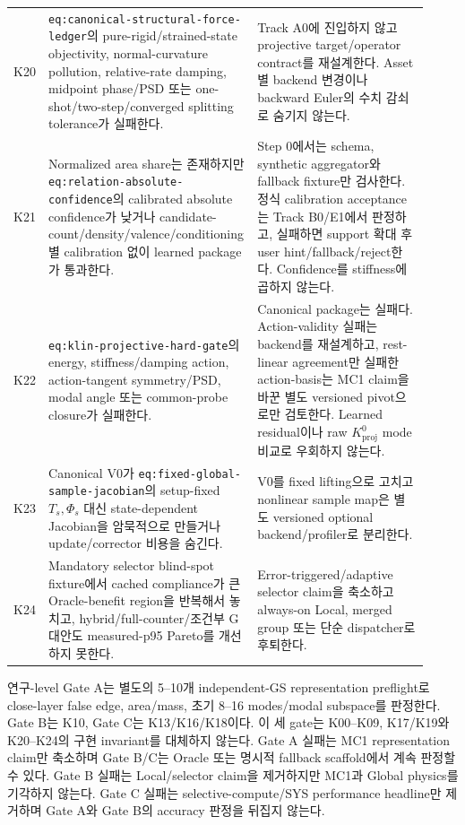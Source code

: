 \documentclass[10pt,a4paper]{article}
\newcommand{\code}[1]{\texttt{#1}}
\begin{document}
\begin{longtable}{L{0.06\linewidth}L{0.45\linewidth}L{0.41\linewidth}}
\addlinespace
K20 & \code{eq:canonical-structural-force-ledger}의 pure-rigid/strained-state objectivity,
normal-curvature pollution, relative-rate damping, midpoint phase/PSD 또는 one-shot/two-step/converged splitting tolerance가 실패한다. & Track A0에 진입하지 않고 projective target/operator contract를 재설계한다. Asset별 backend 변경이나 backward Euler의 수치 감쇠로 숨기지 않는다. \\
\addlinespace
K21 & Normalized area share는 존재하지만 \code{eq:relation-absolute-confidence}의
calibrated absolute confidence가 낮거나 candidate-count/density/valence/conditioning별 calibration 없이 learned package가 통과한다. & Step 0에서는 schema, synthetic aggregator와 fallback fixture만 검사한다. 정식 calibration acceptance는 Track B0/E1에서 판정하고, 실패하면 support 확대 후 user hint/fallback/reject한다. Confidence를 stiffness에 곱하지 않는다. \\
\addlinespace
K22 & \code{eq:klin-projective-hard-gate}의 energy, stiffness/damping action,
action-tangent symmetry/PSD, modal angle 또는 common-probe closure가 실패한다. & Canonical package는 실패다. Action-validity 실패는 backend를 재설계하고, rest-linear agreement만 실패한 action-basis는 MC1 claim을 바꾼 별도 versioned pivot으로만 검토한다. Learned residual이나 raw \(K_{\mathrm{proj}}^0\) mode 비교로 우회하지 않는다. \\
\addlinespace
K23 & Canonical V0가 \code{eq:fixed-global-sample-jacobian}의 setup-fixed
\(T_s,\Phi_s\) 대신 state-dependent Jacobian을 암묵적으로 만들거나 update/corrector 비용을 숨긴다. & V0를 fixed lifting으로 고치고 nonlinear sample map은 별도 versioned optional backend/profiler로 분리한다. \\
\addlinespace
K24 & Mandatory selector blind-spot fixture에서 cached compliance가 큰 Oracle-benefit region을 반복해서 놓치고,
hybrid/full-counter/조건부 G 대안도 measured-p95 Pareto를 개선하지 못한다. & Error-triggered/adaptive selector claim을 축소하고 always-on Local, merged group 또는 단순 dispatcher로 후퇴한다. \\
\bottomrule
\end{longtable}

연구-level Gate A는 별도의 5--10개 independent-GS representation preflight로
close-layer false edge, area/mass, 초기 8--16 modes/modal subspace를 판정한다.
Gate B는 K10, Gate C는 K13/K16/K18이다.
이 세 gate는 K00--K09, K17/K19와 K20--K24의 구현 invariant를 대체하지 않는다.
Gate A 실패는 MC1 representation claim만 축소하며 Gate B/C는 Oracle 또는
명시적 fallback scaffold에서 계속 판정할 수 있다.
Gate B 실패는 Local/selector claim을 제거하지만 MC1과 Global physics를 기각하지 않는다.
Gate C 실패는 selective-compute/SYS performance headline만 제거하며
Gate A와 Gate B의 accuracy 판정을 뒤집지 않는다.
\end{document}
